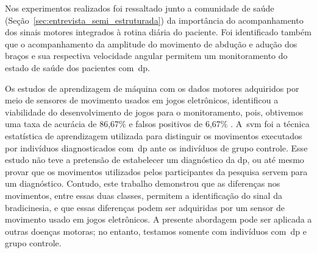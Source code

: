 



Nos experimentos realizados foi ressaltado junto a comunidade de saúde (Seção~\ref{sec:entrevista_semi_estruturada}) da importância do acompanhamento dos sinais motores integrados à rotina diária do paciente. Foi identificado também que o acompanhamento da amplitude do movimento de abdução e adução dos braços e sua respectiva velocidade angular permitem um monitoramento do estado de saúde dos pacientes com~\ac{dp}.

Os estudos de aprendizagem de máquina com os dados motores adquiridos por meio de sensores de movimento usados em jogos eletrônicos, identificou a viabilidade do desenvolvimento de jogos para o monitoramento, pois, obtivemos uma taxa de acurácia de 86,67\% e falsos positivos de 6,67\% . A~\ac{svm} foi a técnica estatística de aprendizagem utilizada para distinguir os movimentos executados por indivíduos diagnosticados com~\ac{dp} ante os indivíduos de grupo controle. Esse estudo não teve a pretensão de estabelecer um diagnóstico da \ac{dp}, ou até mesmo provar que os movimentos utilizados pelos participantes da pesquisa servem para um diagnóstico. Contudo, este trabalho demonstrou que as diferenças nos movimentos, entre essas duas classes, permitem a identificação do sinal da bradicinesia, e que essas diferenças podem ser adquiridas por um sensor de movimento usado em jogos eletrônicos. A presente abordagem pode ser aplicada a outras doenças motoras; no entanto, testamos somente com indivíduos com~\ac{dp} e grupo controle.

